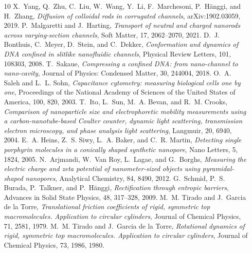 \documentclass[dvipdfmx]{ampbt}
\def\numberofspines{1}
\begin{document}
  \begin{thebibliography}{10}
    X.~Yang, Q.~Zhu, C.~Liu, W.~Wang, Y.~Li, F.~Marchesoni, P.~Hänggi, and H.~Zhang, \textit{Diffusion of colloidal rods in corrugated channels}, arXiv:1902.03059, 2019.
    P.~Malgaretti and J.~Harting, \textit{Transport of neutral and charged nanorods across varying-section channels}, Soft Matter, 17, 2062--2070, 2021.
    D.~J. Bonthuis, C.~Meyer, D.~Stein, and C.~Dekker, \textit{Conformation and dynamics of DNA confined in slitlike nanofluidic channels}, Physical Review Letters, 101, 108303, 2008.
    T.~Sakaue, \textit{Compressing a confined DNA: from nano-channel to nano-cavity}, Journal of Physics: Condensed Matter, 30, 244004, 2018.
    O.~A. Saleh and L.~L. Sohn, \textit{Capacitance cytometry: measuring biological cells one by one}, Proceedings of the National Academy of Sciences of the United States of America, 100, 820, 2003.
    T.~Ito, L.~Sun, M.~A. Bevan, and R.~M. Crooks, \textit{Comparison of nanoparticle size and electrophoretic mobility measurements using a carbon-nanotube-based Coulter counter, dynamic light scattering, transmission electron microscopy, and phase analysis light scattering}, Langmuir, 20, 6940, 2004.
    E.~A. Heins, Z.~S. Siwy, L.~A. Baker, and C.~R. Martin, \textit{Detecting single porphyrin molecules in a conically shaped synthetic nanopore}, Nano Letters, 5, 1824, 2005.
    N.~Arjmandi, W.~Van Roy, L.~Lagae, and G.~Borghs, \textit{Measuring the electric charge and zeta potential of nanometer-sized objects using pyramidal-shaped nanopores}, Analytical Chemistry, 84, 8490, 2012.
    G.~Schmid, P.~S. Burada, P.~Talkner, and P.~Hänggi, \textit{Rectification through entropic barriers}, Advances in Solid State Physics, 48, 317--328, 2009.
    M.~M. Tirado and J.~Garcia de la Torre, \textit{Translational friction coefficients of rigid, symmetric top macromolecules. Application to circular cylinders}, Journal of Chemical Physics, 71, 2581, 1979.
    M.~M. Tirado and J.~Garcia de la Torre, \textit{Rotational dynamics of rigid, symmetric top macromolecules. Application to circular cylinders}, Journal of Chemical Physics, 73, 1986, 1980.
  \end{thebibliography}

\fi
\ifoutputcover
  \cleardoublepage
  \makecover                      %
  \makespine[\numberofspines]     %
\fi
\ifoutputabstractforsubmission
  \makeabstractforsubmission      %
\fi
\end{document}
